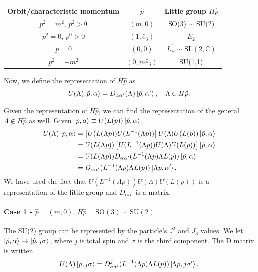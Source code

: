 \documentclass{article}
\begin{document}
\begin{center}
\begin{tabular}{ |c|c|c| } 
\hline
 Orbit/characteristic momentum & $\hat{p}$ & Little group $H\hat{p}$ \\ 
 \hline
 $p^2=m^2,\,p^2>0$ & $(m,0)$ & SO(3) $\sim$ SU(2) \\ 
 \hline
 $p^2=0,\,p^0>0$ & $(1,\hat{e}_3)$ & $E_2$ \\ 
 \hline
 $p=0$ & $(0,0)$ & $L^\uparrow_+\sim\text{SL}(2,\mathbb C)$\\
 \hline
 $p^2=-m^2$ & $(0,m\hat e_3)$ & SU(1,1)\\
 \hline
\end{tabular}
\end{center}

Now, we define the representation of $H\hat p$ as 
$$U(\Lambda)\ket{\hat p,\alpha}=D_{\alpha\alpha'}(\Lambda)\ket{\hat p,\alpha'},\quad\Lambda\in H\hat p.$$

Given the representation of $H\hat p$, we can find the representation of the general $\Lambda\notin H\hat p$ as well. Given $\ket{p,\alpha}\equiv U(L(p))\ket{\hat p,\alpha}$,
\begin{align*}
    U(\Lambda)\ket{p,\alpha}&=\left[U(L(\Lambda p))U(L^{-1}(\Lambda p))\right]U(\Lambda)U(L(p))\ket{\hat p,\alpha}\\
    &=U(L(\Lambda p))\left[U(L^{-1}(\Lambda p))U(\Lambda)U(L(p))\right]\ket{\hat p,\alpha}\\
    &=U(L(\Lambda p))D_{\alpha\alpha'}(L^{-1}(\Lambda p)\Lambda L(p))\ket{\hat p,\alpha}\\
    &=D_{\alpha\alpha'}(L^{-1}(\Lambda p)\Lambda L(p))\ket{\Lambda p,\alpha'}.
\end{align*}
We have used the fact that $U(L^{-1}(\Lambda p))U(\Lambda)U(L(p))$ is a representation of the little group and $D_{\alpha\alpha'}$ is a matrix.

\paragraph{Case 1 - $\hat p=(m,0),\,H\hat p=\text{SO}(3)\sim\text{SU}(2)$}

The SU(2) group can be represented by the particle's $J^2$ and $J_3$ values. We let $\ket{\hat p,\alpha}\to\ket{\hat p,j\sigma}$, where $j$ is total spin and $\sigma$ is the third component. The D matrix is written 
$$U(\Lambda)\ket{p,j\sigma}=D^j_{\sigma\sigma'}(L^{-1}(\Lambda p)\Lambda L(p))\ket{\Lambda p,j\sigma'}.$$
\end{document}
